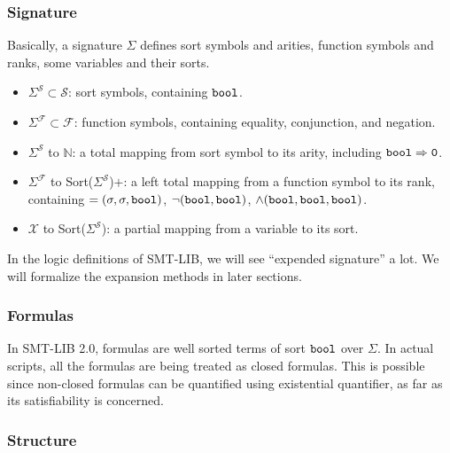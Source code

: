 \documentclass[10pt,twocolumn,letter]{article}
\theoremstyle{definition}
\begin{document}
\subsubsection{Signature}

Basically, a signature $\Sigma$ defines sort symbols and arities, function symbols and ranks, some variables and their sorts.

\begin{itemize}
\item $\Sigma^\mathcal{S} \subset \mathcal{S}$: sort symbols, containing $\tt bool$.
\item $\Sigma^\mathcal{F} \subset \mathcal{F}$: function symbols, containing equality, conjunction, and negation.
\item $\Sigma^\mathcal{S}$ to $\mathbb{N}$: a total mapping from sort symbol to its arity, including $\tt bool \Rightarrow 0$.
\item $\Sigma^\mathcal{F}$ to Sort($\Sigma^\mathcal{S}$)$+$: a left total mapping from a function symbol to its rank, containing $=(\sigma, \sigma, {\tt bool} )$, $\neg({\tt bool},{\tt bool})$, $\wedge ({\tt bool}, {\tt bool}, {\tt bool})$.
\item $\mathcal{X}$ to Sort($\Sigma^\mathcal{S}$): a partial mapping from a variable to its sort.
\end{itemize}

In the logic definitions of SMT-LIB, we will see ``expended signature'' a lot. We will formalize the expansion methods in later sections.

\subsubsection{Formulas}

In SMT-LIB 2.0, formulas are well sorted terms of sort $\tt bool$ over $\Sigma$. In actual scripts, all the formulas are being treated as closed formulas. This is possible since non-closed formulas can be quantified using existential quantifier, as far as its satisfiability is concerned.

\subsubsection{Structure}
\end{document}
